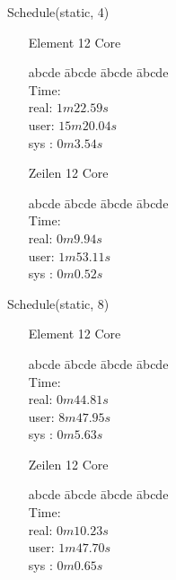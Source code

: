 \documentclass[11pt]{article}
\begin{document}
{{Schedule(static, 4)\\
\begin{enumerate}[leftmargin=4cm]
\item[Element 12 Core]
\begin{tabbing}
abcde \= abcde \= abcde \= abcde \kill
\\Time:\\
\>real: $1m22.59s$ \\
\>user: $15m20.04s$ \\
\>sys : $0m3.54s$ \\
\end{tabbing}
\item[Zeilen 12 Core]
\begin{tabbing}
abcde \= abcde \= abcde \= abcde \kill
\\Time:\\
\>real: $0m9.94s$ \\
\>user: $1m53.11s$ \\
\>sys : $0m0.52s$
\end{tabbing}
\end{enumerate}

Schedule(static, 8)\\
\begin{enumerate}[leftmargin=4cm]
\item[Element 12 Core]
\begin{tabbing}
abcde \= abcde \= abcde \= abcde \kill
\\Time:\\
\>real: $0m44.81s$ \\
\>user: $8m47.95s$ \\
\>sys : $0m5.63s$ \\
\end{tabbing}
\item[Zeilen 12 Core]
\begin{tabbing}
abcde \= abcde \= abcde \= abcde \kill
\\Time:\\
\>real: $0m10.23s$ \\
\>user: $1m47.70s$ \\
\>sys : $0m0.65s$
\end{tabbing}
\end{enumerate}

}}
\end{document}
